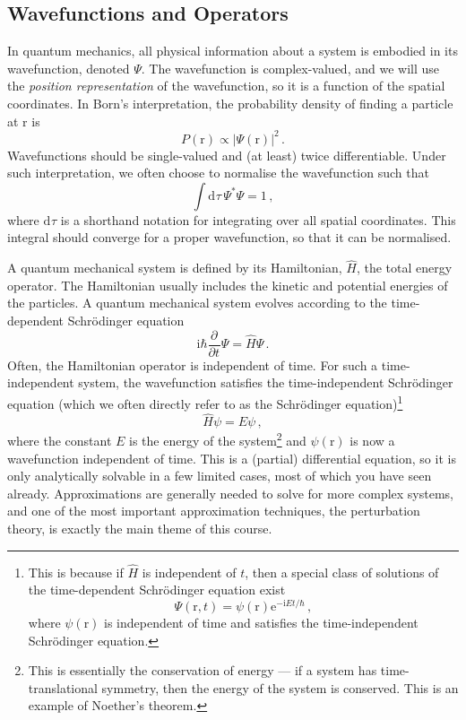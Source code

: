 \documentclass{article}
\theoremstyle{plain}\theoremheaderfont{\normalfont\itshape}\theorembodyfont{\rmfamily}\theoremseparator{.}\newtheorem*{rem}{Remark}\newtheorem*{ex}{Example}\newtheorem*{proof}{Proof}\newtheorem*{altp}{Alternative proof}
\theoremstyle{plain}\theoremheaderfont{\normalfont\bfseries}\theorembodyfont{\rmfamily}\theoremseparator{.}\newtheorem{thm}{Theorem}[section]\newtheorem{lem}[thm]{Lemma}\newtheorem{prop}[thm]{Proposition}\newtheorem*{cor}{Corollary}\newtheorem{defn}[thm]{Definition}\newtheorem{clm}[thm]{Claim}\newtheorem{clminproof}{Claim}
\theoremstyle{break}\theoremheaderfont{\normalfont\itshape}\theorembodyfont{\rmfamily}\theoremseparator{.\medskip}\newtheorem*{proofskip}{Proof}\newtheorem*{exs}{Examples}\newtheorem*{rems}{Remarks}
\theoremstyle{break}\theoremheaderfont{\normalfont\bfseries}\theorembodyfont{\rmfamily}\theoremseparator{.\medskip}\newtheorem{lemskip}[thm]{Lemma}\newtheorem{defnskip}[thm]{Definition}\newtheorem{propskip}[thm]{Proposition}\newtheorem{thmskip}[thm]{Theorem}
\numberwithin{equation}{section}
\newcommand{\ii}{\mathrm{i}}
\newcommand{\ee}{\mathrm{e}}
\newcommand{\dd}[2][]{\mathrm{d}^{#1} #2\,}
\renewcommand{\d}[2][]{\mathrm{d}^{#1} #2}
\newcommand{\pdv}[3][]{\frac{\partial^{#1} #2}{{\partial #3}^{#1}}}
\newcommand{\vb}[1]{\bm{\mathrm{#1}}}
\newcommand{\abs}[1]{\left| #1 \right|}
\begin{document}
    \subsection{Wavefunctions and Operators}
    In quantum mechanics, all physical information about a system is embodied in its wavefunction, denoted \(\Psi\). The wavefunction is complex-valued, and we will use the \textit{position representation} of the wavefunction, so it is a function of the spatial coordinates. In Born's interpretation, the probability density of finding a particle at \(\vb{r}\) is
    \begin{equation}
        P(\vb{r})\propto\abs{\Psi(\vb{r})}^2\,.
    \end{equation}
    Wavefunctions should be single-valued and (at least) twice differentiable. Under such interpretation, we often choose to normalise the wavefunction such that
    \begin{equation}
        \int\dd{\tau}\Psi^*\Psi=1\,,
    \end{equation}
    where \(\d{\tau}\) is a shorthand notation for integrating over all spatial coordinates. This integral should converge for a proper wavefunction, so that it can be normalised.

    A quantum mechanical system is defined by its Hamiltonian, \(\hat{H}\), the total energy operator. The Hamiltonian usually includes the kinetic and potential energies of the particles. A quantum mechanical system evolves according to the time-dependent Schr\"{o}dinger equation
    \begin{equation}
        \ii\hbar\pdv{}{t}\Psi=\hat{H}\Psi\,.
    \end{equation}
    Often, the Hamiltonian operator is independent of time. For such a time-independent system, the wavefunction satisfies the time-independent Schr\"{o}dinger equation (which we often directly refer to as the Schr\"{o}dinger equation)\footnote{This is because if \(\hat{H}\) is independent of \(t\), then a special class of solutions of the time-dependent Schr\"{o}dinger equation exist
    \begin{equation}
        \Psi(\vb{r},t)=\psi(\vb{r})\ee^{-\ii Et/\hbar}\,,
    \end{equation}
    where \(\psi(\vb{r})\) is independent of time and satisfies the time-independent Schr\"{o}dinger equation.}
    \begin{equation}
        \hat{H}\psi=E\psi\,,
    \end{equation}
    where the constant \(E\) is the energy of the system\footnote{This is essentially the conservation of energy --- if a system has time-translational symmetry, then the energy of the system is conserved. This is an example of Noether's theorem.} and \(\psi(\vb{r})\) is now a wavefunction independent of time. This is a (partial) differential equation, so it is only analytically solvable in a few limited cases, most of which you have seen already. Approximations are generally needed to solve for more complex systems, and one of the most important approximation techniques, the perturbation theory, is exactly the main theme of this course.
\end{document}
